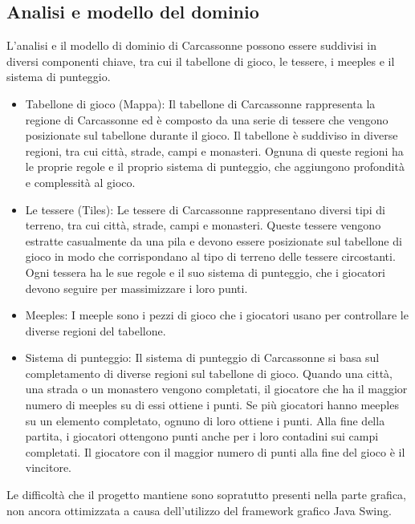 \subsection{Analisi e modello del dominio}
L'analisi e il modello di dominio di Carcassonne possono essere suddivisi in diversi componenti chiave, tra cui il tabellone di gioco, le tessere, i meeples e il sistema di punteggio.
\begin{itemize}
    \item Tabellone di gioco (Mappa): Il tabellone di Carcassonne rappresenta la regione di Carcassonne ed è composto da una serie di tessere che vengono posizionate sul tabellone durante il gioco. Il tabellone è suddiviso in diverse regioni, tra cui città, strade, campi e monasteri. Ognuna di queste regioni ha le proprie regole e il proprio sistema di punteggio, che aggiungono profondità e complessità al gioco.
    \item Le tessere (Tiles): Le tessere di Carcassonne rappresentano diversi tipi di terreno, tra cui città, strade, campi e monasteri. Queste tessere vengono estratte casualmente da una pila e devono essere posizionate sul tabellone di gioco in modo che corrispondano al tipo di terreno delle tessere circostanti. Ogni tessera ha le sue regole e il suo sistema di punteggio, che i giocatori devono seguire per massimizzare i loro punti.
    \item Meeples: I meeple sono i pezzi di gioco che i giocatori usano per controllare le diverse regioni del tabellone. 
    \item Sistema di punteggio: Il sistema di punteggio di Carcassonne si basa sul completamento di diverse regioni sul tabellone di gioco. Quando una città, una strada o un monastero vengono completati, il giocatore che ha il maggior numero di meeples su di essi ottiene i punti. Se più giocatori hanno meeples su un elemento completato, ognuno di loro ottiene i punti. Alla fine della partita, i giocatori ottengono punti anche per i loro contadini sui campi completati. Il giocatore con il maggior numero di punti alla fine del gioco è il vincitore.
\end{itemize}
Le difficoltà che il progetto mantiene sono sopratutto presenti nella parte grafica, non ancora ottimizzata a causa dell'utilizzo del framework grafico Java Swing.
